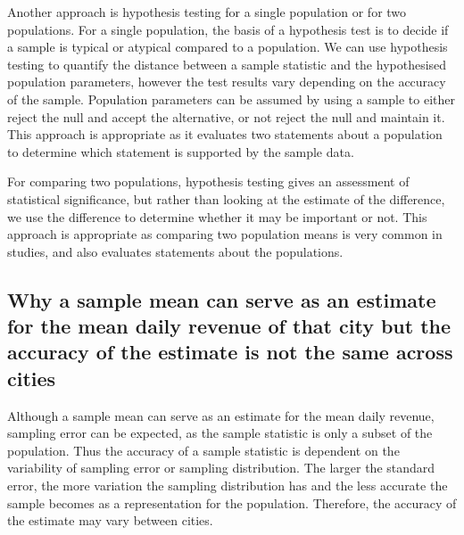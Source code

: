 \documentclass[11pt]{article}
\begin{document}
Another approach is hypothesis testing for a single population or for two populations. For a single population, the basis of a hypothesis test is to decide if a sample is typical or atypical compared to a population. We can use hypothesis testing to quantify the distance between a sample statistic and the hypothesised population parameters, however the test results vary depending on the accuracy of the sample. Population parameters can be assumed by using a sample to either reject the null and accept the alternative, or not reject the null and maintain it. This approach is appropriate as it evaluates two statements about a population to determine which statement is supported by the sample data.

For comparing two populations, hypothesis testing gives an assessment of statistical significance, but rather than looking at the estimate of the difference, we use the difference to determine whether it may be important or not. This approach is appropriate as comparing two population means is very common in studies, and also evaluates statements about the populations.
\subsection{Why a sample mean can serve as an estimate for the mean daily revenue
of that city but the accuracy of the estimate is not the same across cities}
Although a sample mean can serve as an estimate for the mean daily revenue, sampling error can be expected, as the sample statistic is only a subset of the population. Thus the accuracy of a sample statistic is dependent on the variability of sampling error or sampling distribution. The larger the standard error, the more variation the sampling distribution has and the less accurate the sample becomes as a representation for the population. Therefore, the accuracy of the estimate may vary between cities.
\end{document}
